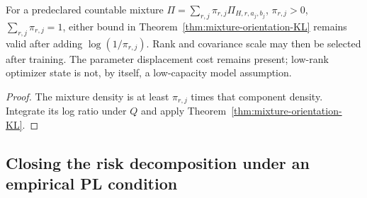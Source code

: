 \begin{corollary}
For a predeclared countable mixture
$\Pi=\sum_{r,j}\pi_{r,j}\Pi_{H,r,a_j,b_j}$,
$\pi_{r,j}>0$, $\sum_{r,j}\pi_{r,j}=1$, either bound in
Theorem~\ref{thm:mixture-orientation-KL} remains valid after adding
$\log(1/\pi_{r,j})$. Rank and covariance scale may then be selected after
training. The parameter displacement cost remains present; low-rank
optimizer state is not, by itself, a low-capacity model assumption.
\end{corollary}
\begin{proof}
The mixture density is at least $\pi_{r,j}$ times that component density.
Integrate its log ratio under $Q$ and apply
Theorem~\ref{thm:mixture-orientation-KL}.
\end{proof}

\subsection{Closing the risk decomposition under an empirical PL condition}
\label{app:end-to-end-risk}

